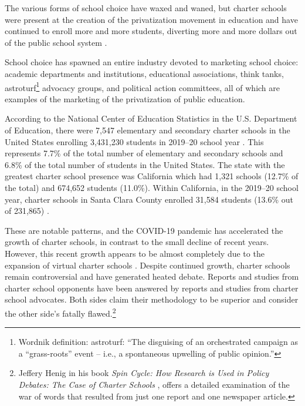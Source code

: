 The various forms of school choice have waxed and waned, but charter schools were present at the creation of the privatization movement in education and have continued to enroll more and more students, diverting more and more dollars out of the public school system \parencites{Lafer2017a}{Lafer2018}{Lafer.etal2021}.
\begin{comment}
  \parencites[131–132]{Lafer2017a}[18]{Lafer2018}[9]{Lafer.etal2021}
\end{comment}
School choice has spawned an entire industry devoted to marketing school choice: academic departments and institutions, educational associations, think tanks, astroturf\footnote{Wordnik definition: astroturf: ``The disguising of an orchestrated campaign as a ``grass-roots'' event – i.e., a spontaneous upwelling of public opinion.''} advocacy groups, and political action committees, all of which are examples of the marketing of the privatization of public education. %

According to the National Center of Education Statistics in the U.S. Department of Education, there were 7,547 elementary and secondary charter schools in the United States enrolling 3,431,230 students in 2019–20 school year \parencite[Table 216.90, p.144]{DeBrey.etal2022}. This represents 7.7\% of the total number of elementary and secondary schools and 6.8\% of the total number of students in the United States. The state with the greatest charter school presence was California which had 1,321 schools (12.7\% of the total) and 674,652 students (11.0\%). Within California, in the 2019–20 school year, charter schools in Santa Clara County enrolled 31,584 students (13.6\% out of 231,865) \parencite{CDEDataQuest2021}.

These are notable patterns, and the COVID-19 pandemic has accelerated the growth of charter schools, in contrast to the small decline of recent years. However, this recent growth appears to be almost completely due to the expansion of virtual charter schools \parencite{Strauss2021}. Despite continued growth, charter schools remain controversial and have generated heated debate. Reports and studies from charter school opponents have been answered by reports and studies from charter school advocates. Both sides claim their methodology to be superior and consider the other side's fatally flawed.\footnote{Jeffery Henig in his book \textit{Spin Cycle: How Research is Used in Policy Debates: The Case of Charter Schools} \parencite{Henig2009}, offers a detailed examination of the war of words that resulted from just one report and one newspaper article.}

